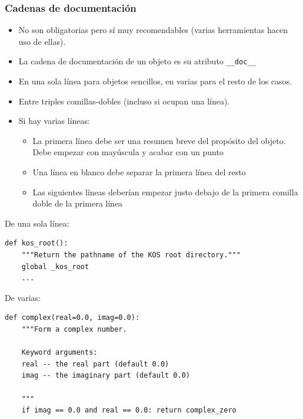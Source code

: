 \begin{frame}[fragile]
\frametitle{Cadenas de documentación}

\begin{small}
\begin{itemize}
\item No son obligatorias pero sí muy recomendables (varias
  herramientas hacen uso de ellas).
\item La cadena de documentación de un objeto es su atributo
  \verb|__doc__|
\item En una sola línea para objetos sencillos, en varias para el
  resto de los casos.
\item Entre triples comillas-dobles (incluso si ocupan una línea).
\item Si hay varias líneas:
  \begin{itemize}
  \item La primera línea debe ser una resumen breve del propósito del
    objeto. Debe empezar con mayúscula y acabar con un punto
  \item Una línea en blanco debe separar la primera línea del resto
  \item Las siguientes líneas deberían empezar justo debajo de la
    primera comilla doble de la primera línea
\end{itemize}
\end{itemize}
\end{small}
\end{frame}



\begin{frame}[fragile]

De una sola línea:
\begin{small}
\begin{verbatim}
def kos_root():
    """Return the pathname of the KOS root directory."""
    global _kos_root
    ...
\end{verbatim}
\end{small}

De varias:
\begin{small}
\begin{verbatim}
def complex(real=0.0, imag=0.0):
    """Form a complex number.

    Keyword arguments:
    real -- the real part (default 0.0)
    imag -- the imaginary part (default 0.0)

    """
    if imag == 0.0 and real == 0.0: return complex_zero
\end{verbatim}
\end{small}
  
\end{frame}


